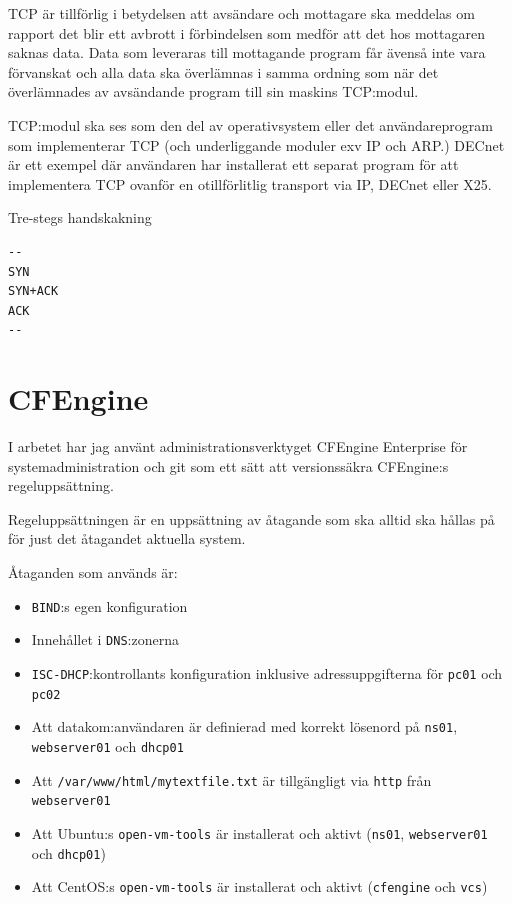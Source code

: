 \documentclass[swedish,10pt,a4paper]{report}
\begin{document}
TCP är tillförlig i betydelsen att avsändare och mottagare ska meddelas om rapport det blir
ett avbrott i förbindelsen som medför att det hos mottagaren saknas data.
Data som leveraras till mottagande program får ävenså inte vara förvanskat och alla data ska överlämnas
i samma ordning som när det överlämnades av avsändande program till sin maskins TCP:modul.

TCP:modul ska ses som den del av operativsystem eller det användareprogram som implementerar TCP (och
underliggande moduler exv IP och ARP.) DECnet är ett exempel där användaren har installerat ett
separat program för att implementera TCP ovanför en otillförlitlig transport via IP, DECnet eller X25.

Tre-stegs handskakning
\begin{verbatim}
--
SYN
SYN+ACK
ACK
--
\end{verbatim}

\chapter{CFEngine}\label{sec:cfengine}

I arbetet har jag använt administrationsverktyget CFEngine Enterprise
för systemadministration och git som ett sätt att versionssäkra
CFEngine:s regeluppsättning.

Regeluppsättningen är en uppsättning av åtagande som ska
alltid ska hållas på för just det åtagandet aktuella system.

Åtaganden som används är:
\begin{itemize}
\item \texttt{BIND}:s egen konfiguration
\item Innehållet i \texttt{DNS}:zonerna
\item \texttt{ISC-DHCP}:kontrollants konfiguration inklusive adressuppgifterna för \texttt{pc01} och \texttt{pc02}
\item Att datakom:användaren är definierad med korrekt lösenord på \texttt{ns01}, \texttt{webserver01} och \texttt{dhcp01}
\item Att \texttt{/var/www/html/mytextfile.txt} är tillgängligt via \texttt{http} från \texttt{webserver01}
\item Att Ubuntu:s \texttt{open-vm-tools} är installerat och aktivt (\texttt{ns01}, \texttt{webserver01} och \texttt{dhcp01})
\item Att CentOS:s \texttt{open-vm-tools} är installerat och aktivt (\texttt{cfengine} och \texttt{vcs})
\end{itemize}
\end{document}
